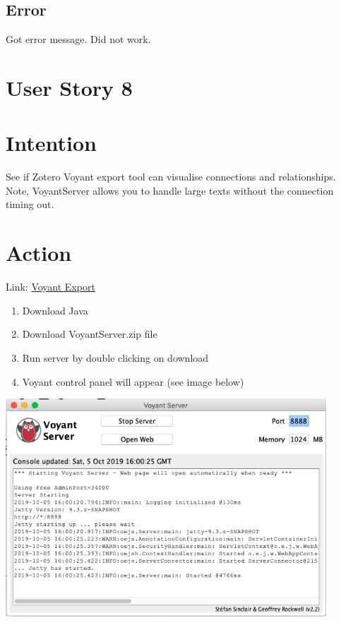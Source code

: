 \documentclass{article}
\begin{document}
\subsection{Error}
Got error message. Did not work. 

\section{User Story 8}
\section{Intention}
See if Zotero Voyant export tool can visualise connections and relationships. Note, VoyantServer allows you to handle large texts without the connection timing out. 

\section{Action}
Link: \href{http://docs.voyant-tools.org/resources/run-your-own/voyant-server/}{Voyant Export}
\begin{enumerate}
    \item Download Java
    \item Download VoyantServer.zip file 
    \item Run server by double clicking on download
    \item Voyant control panel will appear (see image below)
\end{enumerate}
\includegraphics[width=12cm]{voyantserver.png}
\end{document}
